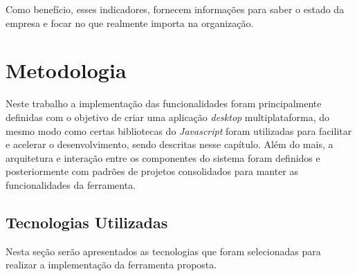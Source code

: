 \documentclass[
	12pt,				%
	openright,			%
	oneside,			%
	a4paper,			%
	english,			%
	brazil				%
	]{abntex2}
\begin{document}
Como benefício, esses indicadores, fornecem informações para saber o estado da empresa e focar no que realmente importa na organização.

\chapter{Metodologia}
\label{ch:metodologia}

Neste trabalho a implementação das funcionalidades foram principalmente definidas com o objetivo de criar uma aplicação \textit{desktop} multiplataforma, do mesmo modo como certas bibliotecas do \textit{Javascript} foram utilizadas para facilitar e acelerar o desenvolvimento, sendo descritas nesse capítulo.
Além do mais, a arquitetura e interação entre os componentes do sistema foram definidos e posteriormente com padrões de projetos consolidados para manter as funcionalidades da ferramenta.

\section{Tecnologias Utilizadas}
Nesta seção serão apresentados as tecnologias que foram selecionadas para realizar a implementação da ferramenta proposta.
\end{document}
